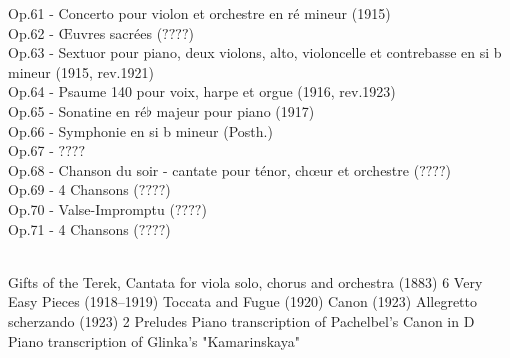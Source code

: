 Op.61 - Concerto pour violon et orchestre en ré mineur (1915)\\
Op.62 - Œuvres sacrées ($????$)\\
Op.63 - Sextuor pour piano, deux violons, alto, violoncelle et contrebasse en si b mineur (1915, rev.1921)\\
Op.64 - Psaume 140 pour voix, harpe et orgue (1916, rev.1923)\\
Op.65 - Sonatine en ré$\flat$ majeur pour piano (1917)\\
Op.66 - Symphonie  en si b mineur (Posth.)\\
Op.67 - $????$\\
Op.68 - Chanson du soir - cantate pour ténor, chœur et orchestre ($????$)\\
Op.69 - 4 Chansons ($????$)\\
Op.70 - Valse-Impromptu  ($????$)\\
Op.71 - 4 Chansons ($????$)

\\

    Gifts of the Terek, Cantata for viola solo, chorus and orchestra (1883)
    6 Very Easy Pieces (1918–1919)
    Toccata and Fugue (1920)
    Canon (1923)
    Allegretto scherzando (1923)
    2 Preludes
    Piano transcription of Pachelbel's Canon in D
    Piano transcription of Glinka's "Kamarinskaya"


